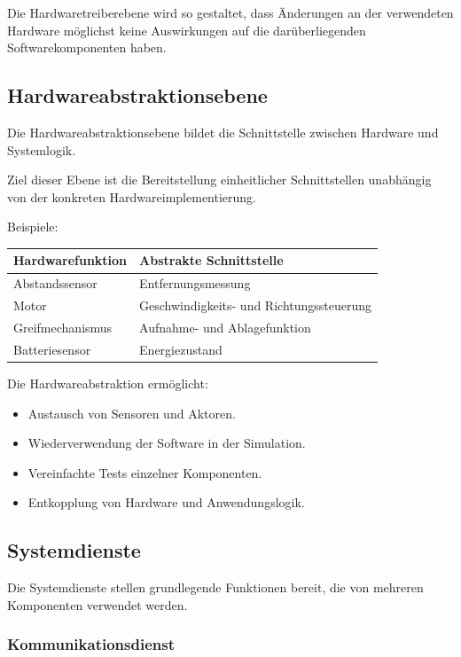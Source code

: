\documentclass[
  a4paper,
  12pt,
  DIV=12,        %
  parskip=half,  %
  headings=small %
]{scrartcl}
\theoremstyle{definition}
\providecommand{\tightlist}{%
  \setlength{\itemsep}{0pt}\setlength{\parskip}{0pt}}
\theoremstyle{definition}
\begin{document}
Die Hardwaretreiberebene wird so gestaltet, dass Änderungen an der
verwendeten Hardware möglichst keine Auswirkungen auf die
darüberliegenden Softwarekomponenten haben.

\subsection{Hardwareabstraktionsebene}\label{hardwareabstraktionsebene-1}

Die Hardwareabstraktionsebene bildet die Schnittstelle zwischen Hardware
und Systemlogik.

Ziel dieser Ebene ist die Bereitstellung einheitlicher Schnittstellen
unabhängig von der konkreten Hardwareimplementierung.

Beispiele:

\begin{longtable}[]{@{}ll@{}}
\toprule\noalign{}
Hardwarefunktion & Abstrakte Schnittstelle \\
\midrule\noalign{}
\endhead
\bottomrule\noalign{}
\endlastfoot
Abstandssensor & Entfernungsmessung \\
Motor & Geschwindigkeits- und Richtungssteuerung \\
Greifmechanismus & Aufnahme- und Ablagefunktion \\
Batteriesensor & Energiezustand \\
\end{longtable}

Die Hardwareabstraktion ermöglicht:

\begin{itemize}
\tightlist
\item
  Austausch von Sensoren und Aktoren.
\item
  Wiederverwendung der Software in der Simulation.
\item
  Vereinfachte Tests einzelner Komponenten.
\item
  Entkopplung von Hardware und Anwendungslogik.
\end{itemize}

\subsection{Systemdienste}\label{systemdienste}

Die Systemdienste stellen grundlegende Funktionen bereit, die von
mehreren Komponenten verwendet werden.

\subsubsection{Kommunikationsdienst}\label{kommunikationsdienst}
\end{document}
